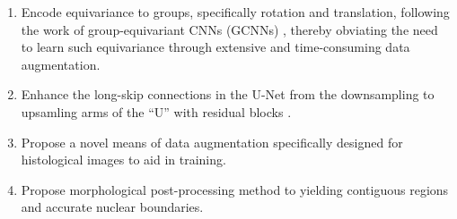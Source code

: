 \begin{enumerate} [resume]
\item Encode equivariance to groups, specifically rotation and translation, following the work of group-equivariant CNNs (GCNNs) \cite{gcnn}, thereby obviating the need to learn such equivariance through extensive and time-consuming data augmentation.
\item Enhance the long-skip connections in the U-Net \cite{unet} from the downsampling to upsamling arms of the “U” with residual blocks \cite{Resnet}. 
\item Propose a novel means of data augmentation
specifically designed for histological images to aid in training.
\item Propose morphological post-processing method to yielding contiguous regions and accurate nuclear boundaries.
\end{enumerate} 


